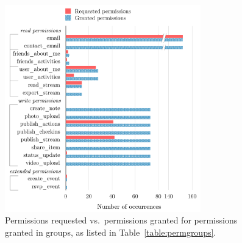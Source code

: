 \documentclass{sig-alternate}
\begin{document}
\begin{figure}[tb!]
  \centering
  \includegraphics[width=8.5cm]{scope_vs_html_cosn}
  \caption{Permissions requested vs.\ permissions granted for permissions granted in groups, as listed in Table~\ref{table:permgroups}.}
  \label{figure:scopevshtml}
\end{figure}
\end{document}
